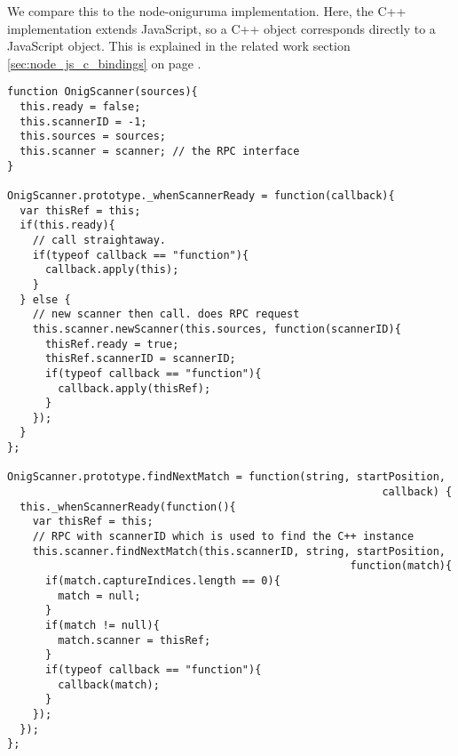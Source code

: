 We compare this to the node-oniguruma implementation. Here, the C++ implementation extends JavaScript, so a C++ object corresponds directly to a JavaScript object. This is explained in the related work section \ref{sec:node_js_c_bindings} on page \pageref{sec:node_js_c_bindings}.

\begin{lstlisting}
function OnigScanner(sources){
  this.ready = false;
  this.scannerID = -1;
  this.sources = sources;
  this.scanner = scanner; // the RPC interface
}

OnigScanner.prototype._whenScannerReady = function(callback){
  var thisRef = this;
  if(this.ready){
    // call straightaway.
    if(typeof callback == "function"){
      callback.apply(this);
    }
  } else {
    // new scanner then call. does RPC request
    this.scanner.newScanner(this.sources, function(scannerID){
      thisRef.ready = true;
      thisRef.scannerID = scannerID;
      if(typeof callback == "function"){
        callback.apply(thisRef);
      }
    });
  }
};

OnigScanner.prototype.findNextMatch = function(string, startPosition, 
                                                           callback) {
  this._whenScannerReady(function(){
    var thisRef = this;
    // RPC with scannerID which is used to find the C++ instance
    this.scanner.findNextMatch(this.scannerID, string, startPosition, 
                                                      function(match){
      if(match.captureIndices.length == 0){
        match = null;
      }
      if(match != null){
        match.scanner = thisRef;
      }
      if(typeof callback == "function"){
        callback(match);
      }
    });
  });
};
\end{lstlisting}


